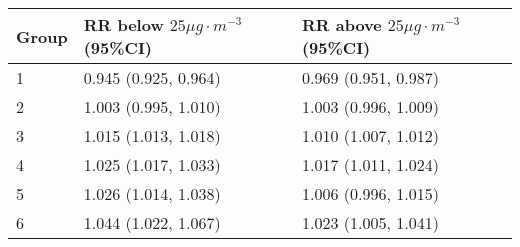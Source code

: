 \begin{tabular}{lll}
  \hline
Group & RR below $25 \mu g \cdot m^{-3}$ (95\%CI) & RR above $25 \mu g \cdot m^{-3}$ (95\%CI) \\ 
  \hline
   1 & 0.945 (0.925, 0.964) & 0.969 (0.951, 0.987) \\ 
     2 & 1.003 (0.995, 1.010) & 1.003 (0.996, 1.009) \\ 
     3 & 1.015 (1.013, 1.018) & 1.010 (1.007, 1.012) \\ 
     4 & 1.025 (1.017, 1.033) & 1.017 (1.011, 1.024) \\ 
     5 & 1.026 (1.014, 1.038) & 1.006 (0.996, 1.015) \\ 
     6 & 1.044 (1.022, 1.067) & 1.023 (1.005, 1.041) \\ 
   \hline
\end{tabular}


